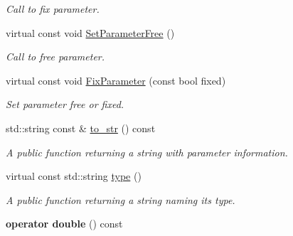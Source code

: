 \begin{DoxyCompactItemize}
\begin{DoxyCompactList}\small\item\em Call to fix parameter. \end{DoxyCompactList}\item 
\hypertarget{class_double_parameter_a7c56ce76351f848a0b02e82b7050679a}{virtual const void \hyperlink{class_double_parameter_a7c56ce76351f848a0b02e82b7050679a}{Set\-Parameter\-Free} ()}\label{class_double_parameter_a7c56ce76351f848a0b02e82b7050679a}

\begin{DoxyCompactList}\small\item\em Call to free parameter. \end{DoxyCompactList}\item 
\hypertarget{class_double_parameter_acdc142eb9be5d49aae687b9e338124a1}{virtual const void \hyperlink{class_double_parameter_acdc142eb9be5d49aae687b9e338124a1}{Fix\-Parameter} (const bool fixed)}\label{class_double_parameter_acdc142eb9be5d49aae687b9e338124a1}

\begin{DoxyCompactList}\small\item\em Set parameter free or fixed. \end{DoxyCompactList}\item 
std\-::string const \& \hyperlink{class_double_parameter_aa5c1baea699e2a93813a351221bdf718}{to\-\_\-str} () const 
\begin{DoxyCompactList}\small\item\em A public function returning a string with parameter information. \end{DoxyCompactList}\item 
virtual const std\-::string \hyperlink{class_double_parameter_a05fddcc6f44effe64ca47b19812046b6}{type} ()
\begin{DoxyCompactList}\small\item\em A public function returning a string naming its type. \end{DoxyCompactList}\item 
\hypertarget{class_double_parameter_abdcaa772fa6ab3a6c0c975a9a455c907}{{\bfseries operator double} () const }\label{class_double_parameter_abdcaa772fa6ab3a6c0c975a9a455c907}

\end{DoxyCompactItemize}
